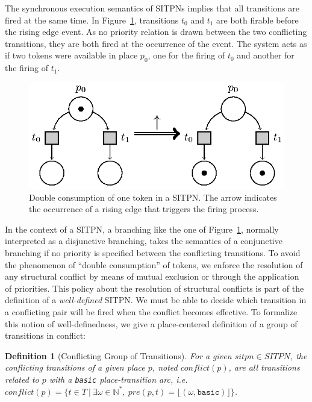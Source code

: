 \documentclass[pdflatex,sn-mathphys]{sn-jnl}%
\theoremstyle{thmstyleone}%
\theoremstyle{thmstyletwo}%
\theoremstyle{thmstylethree}%
\newtheorem{definition}{Definition}%
\begin{document}
The synchronous execution semantics of SITPNs implies that all
transitions are fired at the same time. In
Figure~\ref{fig:double-consum}, transitions $t_0$ and $t_1$ are both
firable before the rising edge event. As no priority relation is drawn
between the two conflicting transitions, they are both fired at the
occurrence of the event. The system acts as if two tokens were
available in place $p_0$, one for the firing of $t_0$ and another for
the firing of $t_1$.

\begin{figure}[H]
  \centering
  \includegraphics[keepaspectratio=true, width=.5\textwidth]{double-consum.eps}
  \caption[Double consumption of token in a SITPN.]{Double consumption
    of one token in a SITPN. %
    The arrow indicates the occurrence of a rising edge that triggers
    the firing process.}
  \label{fig:double-consum}
\end{figure}

In the context of a SITPN, a branching like the one of
Figure~\ref{fig:double-consum}, normally interpreted as a disjunctive
branching, takes the semantics of a conjunctive branching if no
priority is specified between the conflicting transitions. To avoid
the phenomenon of ``double consumption'' of tokens, we enforce the
resolution of any structural conflict by means of mutual exclusion or
through the application of priorities. This policy about the
resolution of structural conflicts is part of the definition of a
\emph{well-defined} SITPN. We must be able to decide which transition
in a conflicting pair will be fired when the conflict becomes
effective. To formalize this notion of well-definedness, we give a
place-centered definition of a group of transitions in conflict:

\begin{definition}[Conflicting Group of Transitions]
  \label{def:cgroup}
  For a given ${sitpn\in{}SITPN}$, the conflicting transitions of a
  given place $p$, noted $conflict(p)$, are all transitions related to
  $p$ with a \texttt{basic} place-transition arc, i.e.
  ${conflict(p)=\{t\in{}T~\vert~\exists{}\omega\in\mathbb{N}^{*},~pre(p,t)=\lfloor(\omega,\mathtt{basic})\rfloor\}}$.
\end{definition}
\end{document}
